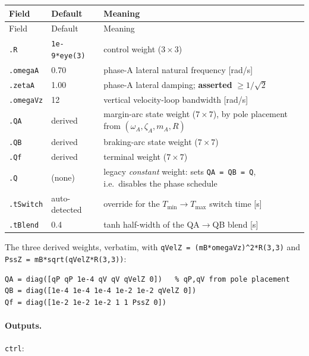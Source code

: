 \documentclass[11pt]{article}
\newcommand{\Tmin}{T_{\min}}
\newcommand{\Tmax}{T_{\max}}
\begin{document}
\begin{center}
\begin{longtable}{@{}L{2.1cm}L{3.1cm}L{9.0cm}@{}}
\toprule
Field & Default & Meaning \\
\midrule
\endfirsthead
\toprule
Field & Default & Meaning \\
\midrule
\endhead
\texttt{.R} & \texttt{1e-9*eye(3)} & control weight ($3\times3$) \\
\texttt{.omegaA} & \num{0.70} & phase-A lateral natural frequency [rad/s] \\
\texttt{.zetaA} & \num{1.00} & phase-A lateral damping; \textbf{asserted}
  $\ge 1/\sqrt2$ \\
\texttt{.omegaVz} & \num{12} & vertical velocity-loop bandwidth [rad/s] \\
\texttt{.QA} & derived & margin-arc state weight ($7\times7$), by pole
  placement from $(\omega_A,\zeta_A,m_A,R)$ \\
\texttt{.QB} & derived & braking-arc state weight ($7\times7$) \\
\texttt{.Qf} & derived & terminal weight ($7\times7$) \\
\texttt{.Q} & (none) & legacy \emph{constant} weight: sets
  \texttt{QA = QB = Q}, i.e.\ disables the phase schedule \\
\texttt{.tSwitch} & auto-detected & override for the $\Tmin\!\to\!\Tmax$
  switch time [s] \\
\texttt{.tBlend} & \num{0.4} & tanh half-width of the QA$\to$QB blend [s] \\
\bottomrule
\end{longtable}
\end{center}

The three derived weights, verbatim, with
\texttt{qVelZ = (mB*omegaVz)\^{}2*R(3,3)} and
\texttt{PssZ = mB*sqrt(qVelZ*R(3,3))}:

\begin{verbatim}
QA = diag([qP qP 1e-4 qV qV qVelZ 0])   % qP,qV from pole placement
QB = diag([1e-4 1e-4 1e-4 1e-2 1e-2 qVelZ 0])
Qf = diag([1e-2 1e-2 1e-2 1 1 PssZ 0])
\end{verbatim}

\paragraph{Outputs.} \texttt{ctrl}:
\end{document}
